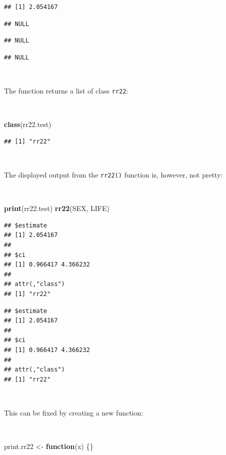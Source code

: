\documentclass[12pt,a4paper]{book}
\newenvironment{Shaded}{\begin{snugshade}}{\end{snugshade}}
\newcommand{\KeywordTok}[1]{\textcolor[rgb]{0.13,0.29,0.53}{\textbf{#1}}}
\newcommand{\StringTok}[1]{\textcolor[rgb]{0.31,0.60,0.02}{#1}}
\newcommand{\ControlFlowTok}[1]{\textcolor[rgb]{0.13,0.29,0.53}{\textbf{#1}}}
\newcommand{\NormalTok}[1]{#1}
\theoremstyle{definition}
\theoremstyle{definition}
\theoremstyle{definition}
\theoremstyle{remark}
\begin{document}
\begin{verbatim}
## [1] 2.054167
\end{verbatim}

\begin{verbatim}
## NULL
\end{verbatim}

\begin{verbatim}
## NULL
\end{verbatim}

\begin{verbatim}
## NULL
\end{verbatim}

~

The function returns a list of class \texttt{rr22}:

~

\begin{Shaded}
\begin{Highlighting}[]
\KeywordTok{class}\NormalTok{(rr22.test)}
\end{Highlighting}
\end{Shaded}

\begin{verbatim}
## [1] "rr22"
\end{verbatim}

~

The displayed output from the \texttt{rr22()} function is, however, not
pretty:

~

\begin{Shaded}
\begin{Highlighting}[]
\KeywordTok{print}\NormalTok{(rr22.test)}
\KeywordTok{rr22}\NormalTok{(SEX, LIFE)}
\end{Highlighting}
\end{Shaded}

\begin{verbatim}
## $estimate
## [1] 2.054167
## 
## $ci
## [1] 0.966417 4.366232
## 
## attr(,"class")
## [1] "rr22"
\end{verbatim}

\begin{verbatim}
## $estimate
## [1] 2.054167
## 
## $ci
## [1] 0.966417 4.366232
## 
## attr(,"class")
## [1] "rr22"
\end{verbatim}

~

This can be fixed by creating a new function:

~

\begin{Shaded}
\begin{Highlighting}[]
\NormalTok{print.rr22 <-}\StringTok{ }\ControlFlowTok{function}\NormalTok{(x) \{\}}
\end{Highlighting}
\end{Shaded}
\end{document}
